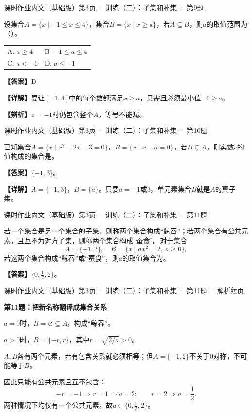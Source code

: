 \documentclass[UTF8,10pt,aspectratio=169]{ctexbeamer}
\makeatletter
\newcommand{\Answer}[1]{\par\vspace{0.2cm}\textbf{【答案】}#1}
\newcommand{\Analysis}[1]{\par\vspace{0.2cm}\textbf{【详解】}#1}
\newcommand{\Choices}[4]{\par\vspace{0.2cm}\begin{tabular}{@{}p{0.47\textwidth}p{0.47\textwidth}@{}}A. #1 & B. #2 \\[0.15cm] C. #3 & D. #4\end{tabular}}
\newcommand{\blank}{\underline{\hspace{1.6cm}}}
\newcommand{\Tip}[1]{\par\vspace{0.2cm}\textbf{【辨析】}#1}
\newcommand{\Source}[1]{{\scriptsize\color{gray}#1}\par\vspace{0.25cm}}
\makeatother
\begin{document}
\begin{frame}
\Source{课时作业内文（基础版）第3页 · 训练（二）：子集和补集 · 第9题}
设集合$A=\{x\mid-1\le x\le4\}$，集合$B=\{x\mid x\ge a\}$，若$A\subseteq B$，则$a$的取值范围为（\quad）。
\Choices{$a\ge4$}{$-1\le a\le4$}{$a<-1$}{$a\le-1$}
\pause
\Answer{D}
\Analysis{要让$[-1,4]$中的每个数都满足$x\ge a$，只需且必须最小值$-1\ge a$。}
\Tip{$a=-1$时仍包含整个$A$，等号不能漏。}
\end{frame}
\begin{frame}
\Source{课时作业内文（基础版）第3页 · 训练（二）：子集和补集 · 第10题}
已知集合$A=\{x\mid x^2-2x-3=0\}$，$B=\{x\mid x-a=0\}$，若$B\subsetneq A$，则实数$a$的值构成的集合是\blank。
\pause
\Answer{$\{-1,3\}$。}
\Analysis{$A=\{-1,3\}$，$B=\{a\}$。只要$a=-1$或$3$，单元素集合$B$就是$A$的真子集。}
\end{frame}
\begin{frame}
\Source{课时作业内文（基础版）第3页 · 训练（二）：子集和补集 · 第11题}
若一个集合是另一个集合的子集，则称两个集合构成“鲸吞”；若两个集合有公共元素，且互不为对方子集，则称两个集合构成“蚕食”。对于集合
\[A=\{-1,2\},\quad B=\{x\mid ax^2=2,\ a\ge0\},\]
若这两个集合构成“鲸吞”或“蚕食”，则$a$的取值集合为\blank。
\pause
\Answer{$\{0,\frac12,2\}$。}
\end{frame}
\begin{frame}
\Source{课时作业内文（基础版）第3页 · 训练（二）：子集和补集 · 第11题 · 解析续页}

\textbf{第11题：把新名称翻译成集合关系}
\par\vspace{0.25cm}
$a=0$时，$B=\varnothing\subseteq A$，构成“鲸吞”。
\pause\par\vspace{0.25cm}
$a>0$时，$B=\{-r,r\}$，其中$r=\sqrt{2/a}>0$。
\par $A,B$各有两个元素，若有包含关系就必须相等；但$A=\{-1,2\}$不关于$0$对称，不可能等于$B$。
\pause\par\vspace{0.25cm}
因此只能有公共元素且互不包含：
\[-r=-1\Rightarrow r=1\Rightarrow a=2;\qquad
r=2\Rightarrow a=\frac12.\]
两种情况下均仅有一个公共元素。故$a\in\{0,\frac12,2\}$。

\end{frame}
\end{document}
